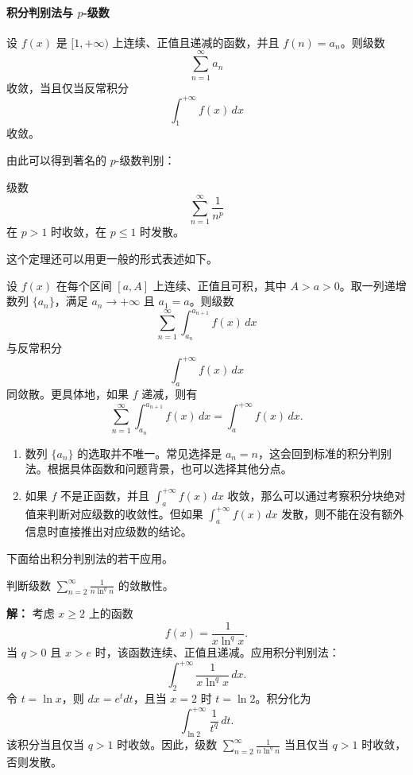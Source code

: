 \paragraph{积分判别法与 $p$-级数}

\begin{theorem}[积分判别法]
设 $f(x)$ 是 $[1,+\infty)$ 上连续、正值且递减的函数，并且 $f(n)=a_n$。则级数
\[
    \sum_{n=1}^{\infty}a_n
\]
收敛，当且仅当反常积分
\[
    \int_1^{+\infty}f(x)\,dx
\]
收敛。
\end{theorem}

由此可以得到著名的 $p$-级数判别：

\begin{corollary}[$p$-级数]
级数
\[
    \sum_{n=1}^{\infty}\frac{1}{n^p}
\]
在 $p>1$ 时收敛，在 $p\leq1$ 时发散。
\end{corollary}

这个定理还可以用更一般的形式表述如下。

\begin{theorem}
设 $f(x)$ 在每个区间 $[a,A]$ 上连续、正值且可积，其中 $A>a>0$。取一列递增数列 $\{a_n\}$，满足 $a_n\to+\infty$ 且 $a_1=a$。则级数
\[
    \sum_{n=1}^{\infty}\int_{a_n}^{a_{n+1}}f(x)\,dx
\]
与反常积分
\[
    \int_a^{+\infty}f(x)\,dx
\]
同敛散。更具体地，如果 $f$ 递减，则有
\[
    \sum_{n=1}^{\infty}\int_{a_n}^{a_{n+1}}f(x)\,dx
    =\int_a^{+\infty}f(x)\,dx.
\]
\end{theorem}

\begin{remark}
\begin{enumerate}
    \item 数列 $\{a_n\}$ 的选取并不唯一。常见选择是 $a_n=n$，这会回到标准的积分判别法。根据具体函数和问题背景，也可以选择其他分点。
    \item 如果 $f$ 不是正函数，并且 $\int_a^{+\infty}f(x)\,dx$ 收敛，那么可以通过考察积分块绝对值来判断对应级数的收敛性。但如果 $\int_a^{+\infty}f(x)\,dx$ 发散，则不能在没有额外信息时直接推出对应级数的结论。
\end{enumerate}
\end{remark}

下面给出积分判别法的若干应用。

\begin{example}
判断级数 $\sum_{n=2}^{\infty}\frac{1}{n\ln^q n}$ 的敛散性。

\textbf{解：} 考虑 $x\geq2$ 上的函数
\[
    f(x)=\frac{1}{x\ln^q x}.
\]
当 $q>0$ 且 $x>e$ 时，该函数连续、正值且递减。应用积分判别法：
\[
    \int_2^{+\infty}\frac{1}{x\ln^q x}\,dx.
\]
令 $t=\ln x$，则 $dx=e^t dt$，且当 $x=2$ 时 $t=\ln 2$。积分化为
\[
    \int_{\ln 2}^{+\infty}\frac{1}{t^q}\,dt.
\]
该积分当且仅当 $q>1$ 时收敛。因此，级数 $\sum_{n=2}^{\infty}\frac{1}{n\ln^q n}$ 当且仅当 $q>1$ 时收敛，否则发散。
\end{example}

